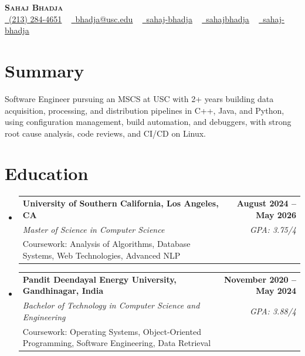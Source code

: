 \documentclass[letterpaper,10pt]{article}
\makeatletter
\newcommand{\resumeEduSubheading}[5]{\vspace{-1pt}\item\begin{tabular*}{1.0\textwidth}[t]{l@{\extracolsep{\fill}}r}\textbf{#1} & \textbf{\small #2} \\\textit{\small #3} & \textit{\small #4} \\\small #5 & \\\end{tabular*}\vspace{-4pt}}
\newcommand{\resumeSubHeadingListStart}{\begin{itemize}[leftmargin=0.0in, label={}]}
\newcommand{\resumeSubHeadingListEnd}{\end{itemize}}
\makeatother
\begin{document}
\begin{center}
{\Huge \scshape \textbf{Sahaj Bhadja}} \\ \vspace{1pt}
\small \href{tel:(213) 284-4651}{\faPhone\ \underline{(213) 284-4651}} ~ \href{mailto: bhadja@usc.edu}{\raisebox{-0.2\height}\faEnvelope\ \underline{bhadja@usc.edu}} ~
\href{https://www.linkedin.com/in/sahaj-bhadja/}{\raisebox{-0.2\height}\faLinkedin\ \underline{sahaj-bhadja}} ~ \href{https://github.com/SAHAJ-BHADJA}{\raisebox{-0.2\height}\faGithub\ \underline{sahajbhadja}} ~
\href{https://sahaj-bhadja.vercel.app/}{\raisebox{-0.2\height}\faGlobe\ \underline{sahaj-bhadja}}
\end{center}
\vspace{-16pt}
\section{Summary}
\begin{itemize}[leftmargin=0.15in, label={}]
\small{\item{Software Engineer pursuing an MSCS at USC with 2+ years building data acquisition, processing, and distribution pipelines in C++, Java, and Python, using configuration management, build automation, and debuggers, with strong root cause analysis, code reviews, and CI/CD on Linux.}}
\end{itemize}
\vspace{-6pt}
\section{Education}
\resumeSubHeadingListStart
\resumeEduSubheading{University of Southern California, Los Angeles, CA}{August 2024 -- May 2026}{Master of Science in Computer Science}{GPA: 3.75/4}{Coursework: Analysis of Algorithms, Database Systems, Web Technologies, Advanced NLP}
\vspace{-9pt}
\resumeEduSubheading{Pandit Deendayal Energy University, Gandhinagar, India}{November 2020 -- May 2024}{Bachelor of Technology in Computer Science and Engineering}{GPA: 3.88/4}{Coursework: Operating Systems, Object-Oriented Programming, Software Engineering, Data Retrieval}
\resumeSubHeadingListEnd
\vspace{-6pt}
\end{document}
